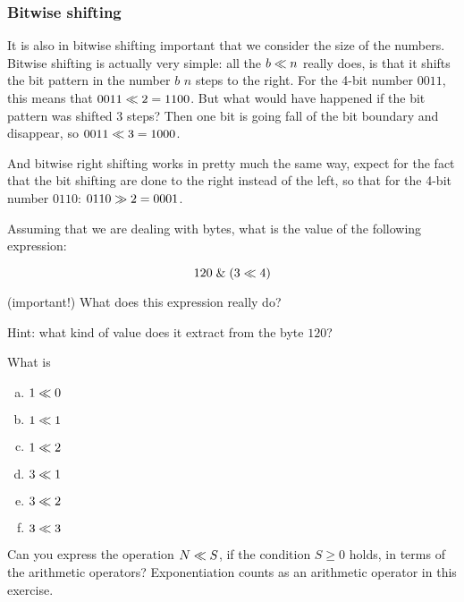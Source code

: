 \subsubsection{Bitwise shifting}

It is also in bitwise shifting important that we consider the size of
the numbers. Bitwise shifting is actually very simple: all the $b
\ll n$ really does, is that it shifts the bit pattern in the
number $b$ $n$ steps to the right. For the 4-bit number $0011$, this
means that $0011 \ll 2 = 1100$. But what would have happened if
the bit pattern was shifted 3 steps? Then one bit is going fall of the
bit boundary and disappear, so $0011 \ll 3 = 1000$.

And bitwise right shifting works in pretty much the same way, expect
for the fact that the bit shifting are done to the right instead of
the left, so that for the 4-bit number $0110$: $0110 \gg 2 =
0001$.

\begin{Exercise}[label={bit-shiting}]
  Assuming that we are dealing with bytes, what is the value of the
  following expression:

  \begin{equation*}
    120 \mathrel{\&} (3 \ll 4)
  \end{equation*}

  (important!) What does this expression really do?

  Hint: what kind of value does it extract from the byte $120$?

\end{Exercise}

\begin{Exercise}[label={bit-equiv}]

  What is

  \begin{enumerate}[(a)]
  \item $1 \ll 0$
  \item $1 \ll 1$
  \item $1 \ll 2$
  \item $3 \ll 1$
  \item $3 \ll 2$
  \item $3 \ll 3$
  \end{enumerate}

  Can you express the operation $N \ll S$, if the condition $S
  \geq 0$ holds, in terms of the arithmetic operators? Exponentiation
  counts as an arithmetic operator in this exercise.

\end{Exercise}

